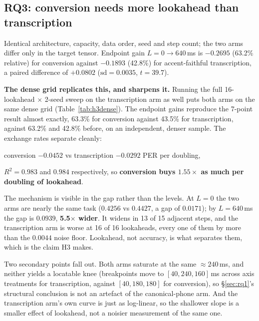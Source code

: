 \documentclass[9pt,a4paper,twocolumn]{article}
\begin{document}
\subsection{RQ3: conversion needs more lookahead than transcription}
\label{sec:rq3}

Identical architecture, capacity, data order, seed and step count; the two arms
differ only in the target tensor. Endpoint gain $L{=}0\rightarrow640$\,ms is
$-0.2695$ (63.2\% relative) for conversion against $-0.1893$ (42.8\%) for
accent-faithful transcription, a paired difference of $+0.0802$
($\mathrm{sd}=0.0035$, $t=39.7$).

\textbf{The dense grid replicates this, and sharpens it.} Running the full
16-lookahead $\times$ 2-seed sweep on the transcription arm as well puts both
arms on the same dense grid (Table~\ref{tab:h3dense}). The endpoint gains
reproduce the 7-point result almost exactly, 63.3\% for conversion against
43.5\% for transcription, against 63.2\% and 42.8\% before, on an
independent, denser sample. The exchange rates separate cleanly:
\begin{center}
conversion $-0.0452$ vs transcription $-0.0292$ PER per doubling,
\end{center}
$R^2 = 0.983$ and $0.984$ respectively, so \textbf{conversion buys
$\mathbf{1.55\times}$ as much per doubling of lookahead}.

The mechanism is visible in the gap rather than the levels. At $L{=}0$ the two
arms are nearly the same task ($0.4256$ vs $0.4427$, a gap of $0.0171$); by
$L{=}640$\,ms the gap is $0.0939$, \textbf{5.5$\times$ wider}. It widens in
13 of 15 adjacent steps, and the transcription arm is worse at 16 of 16
lookaheads, every one of them by more than the $0.0044$ noise floor. Lookahead,
not accuracy, is what separates them, which is the claim H3 makes.

Two secondary points fall out. Both arms saturate at the same
${\approx}240$\,ms, and neither yields a locatable knee (breakpoints move to
$[40, 240, 160]$\,ms across axis treatments for transcription, against
$[40, 180, 180]$ for conversion), so \S\ref{sec:rq1}'s structural conclusion is
not an artefact of the canonical-phone arm. And the transcription arm's own curve is
just as log-linear, so the shallower slope is a smaller effect of lookahead, not
a noisier measurement of the same one.
\end{document}
